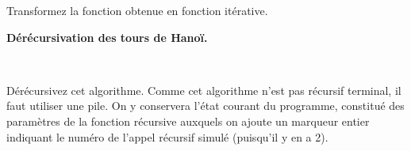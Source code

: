 \documentclass[10pt]{article}\usepackage[correction]{esial}
\begin{document}
\begin{Question}
  Transformez la fonction obtenue en fonction itérative.
\end{Question}
\begin{Reponse}
\end{Reponse}

\Exercice \textbf{Dérécursivation des tours de Hanoï.}

\begin{minipage}{.4\linewidth}
\centerline{}\medskip
  
\end{minipage}~\begin{minipage}{.55\linewidth}
  \begin{Question}
    Dérécursivez cet algorithme. Comme cet algorithme n'est pas récursif
  terminal, il faut utiliser une pile. On y conservera l'état courant du
  programme, constitué des paramètres de la fonction récursive auxquels on
  ajoute un marqueur entier indiquant le numéro de l'appel récursif simulé
  (puisqu'il y en a 2).
\end{Question}
\end{minipage}
\end{document}
